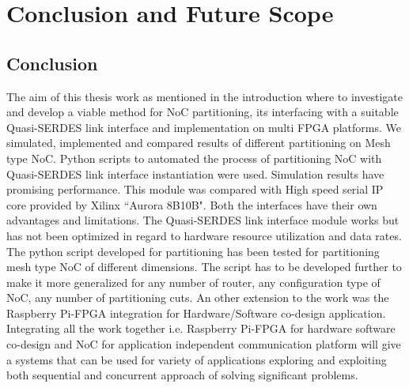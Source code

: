 \chapter{Conclusion and Future Scope}
\label{chapter9}

\section{Conclusion}
The aim of this thesis work as mentioned in the introduction where to investigate and develop a viable method for NoC partitioning, its interfacing with a suitable Quasi-SERDES link interface and implementation on multi FPGA platforms. We simulated, implemented and compared results of different partitioning on Mesh type NoC. Python scripts to automated the process of partitioning NoC with Quasi-SERDES link interface instantiation were used. Simulation results have promising performance. This module was compared with High speed serial IP core provided by Xilinx ``Aurora 8B10B". Both the interfaces have their own advantages and limitations. The Quasi-SERDES link interface module works but has not been optimized in regard to hardware resource utilization and data rates. The python script developed for partitioning has been tested for partitioning mesh type NoC of different dimensions. The script has to be developed further to make it more generalized for any number of router, any configuration type of NoC, any number of partitioning cuts. An other extension to the work was the Raspberry Pi-FPGA integration for Hardware/Software co-design application. Integrating all the work together i.e. Raspberry Pi-FPGA for hardware software co-design and NoC for application independent communication platform will give a systems that can be used for variety of applications exploring and exploiting both sequential and concurrent approach of solving significant problems.

